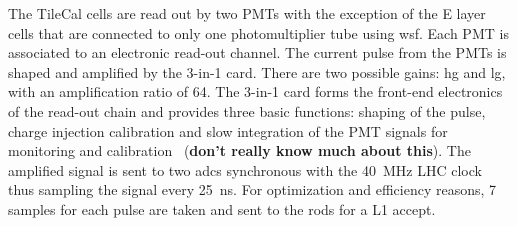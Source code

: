 The TileCal cells are read out by two PMTs with the exception of the E layer
cells that are connected to only one photomultiplier tube using \gls{wsf}. Each
PMT is associated to an electronic read-out channel. The current pulse from the
PMTs is shaped and amplified by the 3-in-1 card. There are two possible gains:
\gls{hg} and \gls{lg}, with an amplification ratio of 64. The 3-in-1 card forms
the front-end electronics of the read-out chain and provides three basic
functions: shaping of the pulse, charge injection calibration and slow
integration of the PMT signals for monitoring and calibration~\cite{TileCal}
(\textbf{don't really know much about this}). The amplified signal is sent to
two \glspl{adc} synchronous with the 40~MHz LHC clock thus sampling the signal
every 25~ns. For optimization and efficiency reasons, 7 samples for each pulse
are taken and sent to the \glspl{rod} for a L1 accept.
